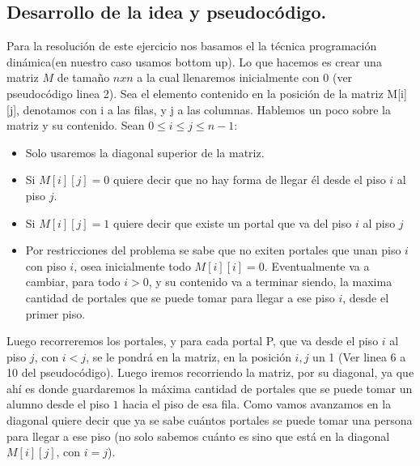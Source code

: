 
\newpage
\subsection{Desarrollo de la idea y pseudocódigo.}

\vspace*{0.3cm}

\textbf{}
Para la resolución de este ejercicio nos basamos el la técnica programación dinámica(en nuestro caso usamos bottom up). Lo que hacemos es crear una matriz $M$ de tamaño $nxn$ a la cual llenaremos inicialmente con 0 (ver pseudocódigo linea 2). Sea el elemento contenido en la posición de la  matriz M[i][j], denotamos con i a las filas, y j a las columnas. \newline
Hablemos un poco sobre la matriz y su contenido. Sean $ 0 \leq i \leq j \leq n-1 $: \newline
\begin{itemize}
	\item Solo usaremos la diagonal superior de la matriz.
	\item Si $ M[i][j] = 0 $ quiere decir que no hay forma de llegar él desde el piso $i$ al piso $j$.%
	\item Si $ M[i][j] = 1 $ quiere decir que existe un portal que va del piso $i$ al piso $j$
	\item Por restricciones del problema se sabe que no exiten portales que unan piso $i$ con piso $i$, osea inicialmente todo $M[i][i] = 0$.  Eventualmente va a cambiar, para todo $i > 0$, y su contenido va a terminar siendo, la maxima cantidad de portales que se puede tomar para llegar a ese piso $i$, desde el primer piso.
\end{itemize}

Luego recorreremos los portales, y para cada portal P, que va desde el piso $i$ al piso $j$, con $i < j$, se le pondrá en la matriz, en la posición $i,j$ un 1 (Ver linea 6 a 10 del pseudocódigo). \newline
Luego iremos recorriendo la matriz, por su diagonal, ya que ahí es donde guardaremos la máxima cantidad de portales que se puede tomar un alumno  desde el piso $1$ hacia el piso de esa fila. Como vamos avanzamos en la diagonal quiere decir que ya se sabe cuántos portales se puede tomar una persona para llegar a ese piso (no solo sabemos cuánto es sino que está en la diagonal $M[i][j]$, con $i = j$). \newline

